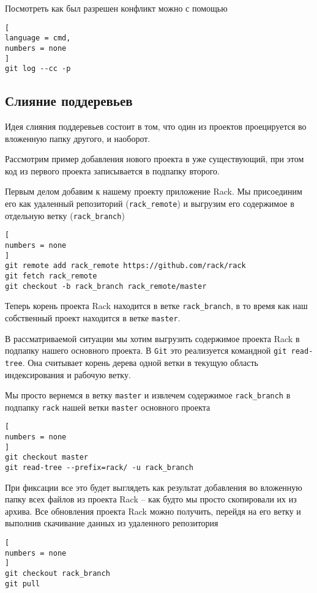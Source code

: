 \documentclass[%
	11pt,
	a4paper,
	utf8,
		]{article}
\begin{document}
Посмотреть как был разрешен конфликт можно с помощью 
\begin{lstlisting}[
language = cmd,
numbers = none
]
git log --cc -p
\end{lstlisting}

\subsection{Слияние поддеревьев}

Идея слияния поддеревьев состоит в том, что один из проектов проецируется во вложенную папку другого, и наоборот.

Рассмотрим пример добавления нового проекта в уже существующий, при этом код из первого проекта записывается в подпапку второго.

Первым делом добавим к нашему проекту приложение Rack. Мы присоединим его как удаленный репозиторий (\texttt{rack\_remote}) и выгрузим его содержимое в отдельную ветку (\texttt{rack\_branch})
\begin{lstlisting}[
numbers = none
]
git remote add rack_remote https://github.com/rack/rack
git fetch rack_remote
git checkout -b rack_branch rack_remote/master
\end{lstlisting}

Теперь корень проекта Rack находится в ветке \texttt{rack\_branch}, в то время как наш собственный проект находится в ветке \texttt{master}.

В рассматриваемой ситуации мы хотим выгрузить содержимое проекта Rack в подпапку нашего основного проекта. В \texttt{Git} это реализуется командной \texttt{git read-tree}. Она считывает корень дерева одной ветки в текущую область индексирования и рабочую ветку.

Мы просто вернемся в ветку \texttt{master} и извлечем содержимое \texttt{rack\_branch} в подпапку \texttt{rack} нашей ветки \texttt{master} основного проекта
\begin{lstlisting}[
numbers = none
]
git checkout master
git read-tree --prefix=rack/ -u rack_branch
\end{lstlisting}

При фиксации все это будет выглядеть как результат добавления во вложенную папку всех файлов из проекта Rack -- как будто мы просто скопировали их из архива. Все обновления проекта Rack можно получить, перейдя на его ветку и выполнив скачивание данных из удаленного репозитория
\begin{lstlisting}[
numbers = none
]
git checkout rack_branch
git pull
\end{lstlisting}
\end{document}
